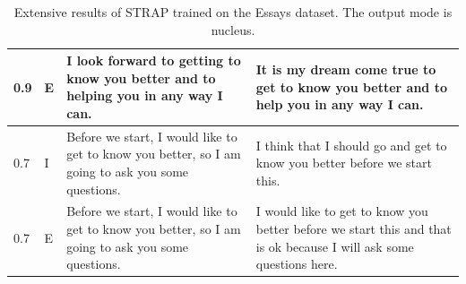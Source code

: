 \documentclass[nomenclature, english, biblatex]{kththesis}
\begin{document}
\begin{table}
\begin{adjustbox}{max width=\textwidth}
\begin{tabular}{|p{}|p{}|p{}|p{}|}
        \hline
        0.9 & E & I look forward to getting to know you better and to helping you in any way I can. & It is my dream come true to get to know you better and to help you in any way I can. \\
        \hline
        0.7 & I & Before we start, I would like to get to know you better, so I am going to ask you some questions. & I think that I should go and get to know you better before we start this. \\
        \hline
        0.7 & E & Before we start, I would like to get to know you better, so I am going to ask you some questions. & I would like to get to know you better before we start this and that is ok because I will ask some questions here.\\
        \hline
        \end{tabular}
    \end{adjustbox}
    \caption{Extensive results of STRAP trained on the Essays dataset. The output mode is nucleus.}
    \label{tab:strap_n_essays_extensive}
\end{table}
\end{document}

